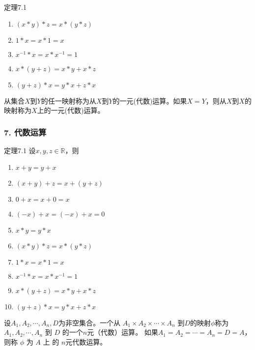 \documentclass{beamer}
\begin{document}
\begin{CJK*}{UTF8}{gbsn}
\begin{frame}
\begin{minipage}[t]{0.49\linewidth}
\begin{block}{定理7.1}
\begin{enumerate}
   \item   $(x * y) * z = x * (y *z)$
   \item   $1 * x = x * 1 = x$
   \item   $x^{-1} * x = x * x^{-1} = 1$
   \item   $x* (y + z) = x * y + x * z$
   \item   $(y + z) * x = y * x + z * x$
    \end{enumerate}
  \end{block}\pause
\end{minipage}
\begin{minipage}[t]{0.49\linewidth}
  \begin{Def}
    从集合$X$到$Y$的任一映射称为从$X$到$Y$的\alert{一元(代数)运算}。如果$X=Y$，则从$X$到$X$的映射称为$X$上的\alert{一元(代数)运算}。
  \end{Def}
\end{minipage}
\end{frame}

\begin{frame}
  \frametitle{7. 代数运算}
  \begin{minipage}[t]{0.49\linewidth}
  \begin{block}{定理7.1}
    设$x, y, z \in \mathbb{R}$，则
   \begin{enumerate}
   \item   $x + y = y + x$
   \item   $(x + y) + z = x + (y + z)$
   \item   $0 + x = x + 0 = x$
   \item   $(-x) + x = (-x) + x = 0$
   \item   $x * y = y * x$
   \item   $(x * y) * z = x * (y *z)$
   \item   $1 * x = x * 1 = x$
   \item   $x^{-1} * x = x * x^{-1} = 1$
   \item   $x* (y + z) = x * y + x * z$
   \item   $(y + z) * x = y * x + z * x$
    \end{enumerate}
  \end{block}\pause
\end{minipage}
\begin{minipage}[t]{0.49\linewidth}
  \begin{Def}
    设$A_1, A_2, \cdots, A_n, D$为非空集合。一个从 $A_1\times A_2\times \cdots \times A_n$ 到$D$的映射$\phi$称为 $A_1, A_2, \cdots, A_n$ 到 $D$ 的一个\alert{$n$元（代数）运算}。
    如果$A_1=A_2=\cdots=A_n=D=A$，则称 $\phi$ 为 $A$ 上 的 \alert{$n$元代数运算}。
  \end{Def}
\end{minipage}
\end{frame}


\end{CJK*}
\end{document}
